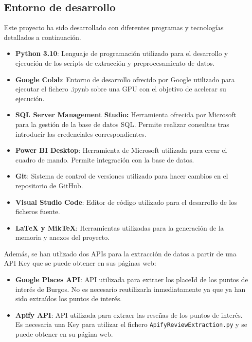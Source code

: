 \subsection{Entorno de desarrollo}

Este proyecto ha sido desarrollado con diferentes programas y tecnologías detallados a continuación.

\begin{itemize}
    \item \textbf{Python 3.10}: Lenguaje de programación utilizado para el desarrollo y ejecución de los scripts de extracción y preprocesamiento de datos.
    \item \textbf{Google Colab}: Entorno de desarrollo ofrecido por Google utilizado para ejecutar el fichero .ipynb sobre una GPU con el objetivo de acelerar su ejecución.
    \item \textbf{SQL Server Management Studio:} Herramienta ofrecida por Microsoft para la gestión de la base de datos SQL. Permite realizar consultas tras introducir las credenciales correspondientes.
    \item \textbf{Power BI Desktop}: Herramienta de Microsoft utilizada para crear el cuadro de mando. Permite integración con la base de datos.
    \item \textbf{Git}: Sistema de control de versiones utilizado para hacer cambios en el repositorio de GitHub.
    \item \textbf{Visual Studio Code}: Editor de código utilizado para el desarrollo de los ficheros fuente.
    \item \textbf{LaTeX y MikTeX}: Herramientas utilizadas para la generación de la memoria y anexos del proyecto.
\end{itemize}

Además, se han utlizado dos APIs para la extracción de datos a partir de una API Key que se puede obtener en sus páginas web:
\begin{itemize}
    \item \textbf{Google Places API}: API utilizada para extraer los placeId de los puntos de interés de Burgos. No es necesario reutilizarla inmediatamente ya que ya han sido extraídos los puntos de interés. 
    \item \textbf{Apify API}: API utilizada para extraer las reseñas de los puntos de interés. Es necesaria una Key para utilizar el fichero \texttt{ApifyReviewExtraction.py} y se puede obtener en su página web.
\end{itemize}

